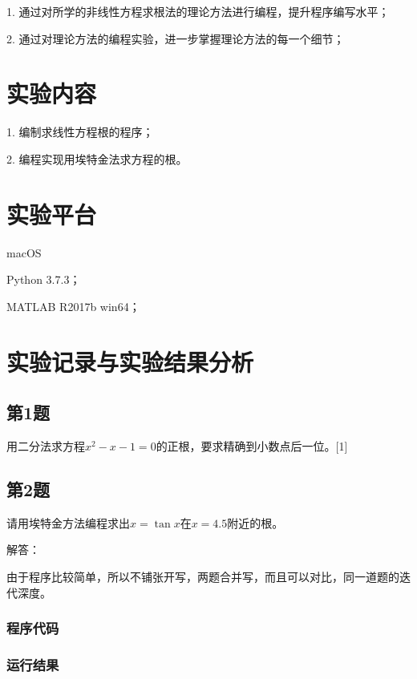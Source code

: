 \documentclass[UTF8, a4paper, zihao=-4, bibliography=totoc]{ctexart}
\begin{document}
1. 通过对所学的非线性方程求根法的理论方法进行编程，提升程序编写水平；

2. 通过对理论方法的编程实验，进一步掌握理论方法的每一个细节；

\section{实验内容}

1. 编制求线性方程根的程序；

2. 编程实现用埃特金法求方程的根。

\section{实验平台}

macOS

Python 3.7.3；

MATLAB R2017b win64；

\section{实验记录与实验结果分析}

\subsection{第1题}

用二分法求方程$x^2-x-1=0$的正根，要求精确到小数点后一位。[1]

\subsection{第2题}

请用埃特金方法编程求出$x=\tan⁡x$在$x=4.5$附近的根。

解答：

由于程序比较简单，所以不铺张开写，两题合并写，而且可以对比，同一道题的迭代深度。
\subsubsection{程序代码}



\subsubsection{运行结果}
\end{document}
